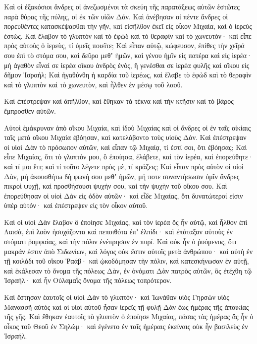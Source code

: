 {Καὶ οἱ ἑξακόσιοι ἄνδρες οἱ ἀνεζωσμένοι τὰ σκεύη τῆς παρατάξεως αὐτῶν ἑστῶτες παρὰ θύρας τῆς πύλης, οἱ ἐκ τῶν υἱῶν Δάν.
Καὶ ἀνέβησαν οἱ πέντε ἄνδρες οἱ πορευθέντες κατασκέψασθαι τὴν γῆν,
καὶ εἰσῆλθον ἐκεῖ εἰς οἶκον Μιχαία, καὶ ὁ ἱερεὺς ἑστώς. Καὶ ἔλαβον τὸ γλυπτὸν καὶ τὸ ἐφὼδ καὶ τὸ θεραφὶν καὶ τὸ χωνευτόν· καὶ εἶπε πρὸς αὐτοὺς ὁ ἱερεὺς, τί ὑμεῖς ποιεῖτε;
Καὶ εἶπαν αὐτῷ, κώφευσον, ἐπίθες τὴν χεῖρά σου ἐπὶ τὸ στόμα σου, καὶ δεῦρο μεθʼ ἡμῶν, καὶ γένου ἡμῖν εἰς πατέρα καὶ εἰς ἱερέα· μὴ ἀγαθὸν εἶναί σε ἱερέα οἴκου ἀνδρὸς ἑνὸς, ἢ γενέσθαι σε ἱερέα φυλῆς καὶ οἴκου εἰς δῆμον Ἰσραήλ;
Καὶ ἠγαθύνθη ἡ καρδία τοῦ ἱερέως, καὶ ἔλαβε τὸ ἐφὼδ καὶ τὸ θεραφὶν καὶ τὸ γλυπτὸν καὶ τὸ χωνευτὸν, καὶ ἦλθεν ἐν μέσῳ τοῦ λαοῦ.
\par }{\PP {}Καὶ ἐπέστρεψαν καὶ ἀπῆλθον, καὶ ἔθηκαν τὰ τέκνα καὶ τὴν κτῆσιν καὶ τὸ βάρος ἔμπροσθεν αὐτῶν.
\par }{\PP {}Αὐτοὶ ἐμάκρυναν ἀπὸ οἴκου Μιχαία, καὶ ἰδοὺ Μιχαίας καὶ οἱ ἄνδρες οἱ ἐν ταῖς οἰκίαις ταῖς μετὰ οἴκου Μιχαία ἐβόησαν, καὶ κατελάβοντο τοὺς υἱοὺς Δάν.
Καὶ ἐπέστρεψαν οἱ υἱοὶ Δὰν τὸ πρόσωπον αὐτῶν, καὶ εἶπαν τῷ Μιχαίᾳ, τί ἐστί σοι, ὅτι ἐβόησας;
Καὶ εἶπε Μιχαίας, ὅτι τὸ γλυπτόν μου, ὃ ἐποίησα, ἐλάβετε, καὶ τὸν ἱερέα, καὶ ἐπορεύθητε· καὶ τί μοι ἔτι; καὶ τί τοῦτο λέγετε πρὸς μὲ, τί κράζεις;
Καὶ εἶπαν πρὸς αὐτὸν οἱ υἱοὶ Δὰν, μὴ ἀκουσθήτω δὴ φωνή σου μεθʼ ἡμῶν, μή ποτε συναντήσωσιν ὑμῖν ἄνδρες πικροὶ ψυχῇ, καὶ προσθήσουσι ψυχήν σου, καὶ τὴν ψυχὴν τοῦ οἴκου σου.
Καὶ ἐπορεύθησαν οἱ υἱοὶ Δὰν εἰς ὁδὸν αὐτῶν· καὶ εἶδε Μιχαίας, ὅτι δυνατώτεροί εἰσιν ὑπὲρ αὐτόν· καὶ ἐπέστρεψεν εἰς τὸν οἶκον αὐτοῦ.
\par }{\PP {}Καὶ οἱ υἱοὶ Δὰν ἔλαβον ὃ ἐποίησε Μιχαίας, καὶ τὸν ἱερέα ὃς ἦν αὐτῷ, καὶ ἦλθον ἐπὶ Λαισὰ, ἐπὶ λαὸν ἡσυχάζοντα καὶ πεποιθότα ἐπʼ ἐλπίδι· καὶ ἐπάταξαν αὐτοὺς ἐν στόματι ῥομφαίας, καὶ τὴν πόλιν ἐνέπρησαν ἐν πυρί.
Καὶ οὐκ ἦν ὁ ῥυόμενος, ὅτι μακράν ἐστιν ἀπὸ Σιδωνίων, καὶ λόγος οὐκ ἔστιν αὐτοῖς μετὰ ἀνθρώπου· καὶ αὐτὴ ἐν τῇ κοιλάδι τοῦ οἴκου Ῥαάβ· καὶ ᾠκοδόμησαν τὴν πόλιν, καὶ κατεσκήνωσαν ἐν αὐτῇ,
καὶ ἐκάλεσαν τὸ ὄνομα τῆς πόλεως Δὰν, ἐν ὀνόματι Δὰν πατρὸς αὐτῶν, ὃς ἐτέχθη τῷ Ἰσραήλ· καὶ ἦν Οὐλαμαῒς ὄνομα τῆς πόλεως τοπρότερον.
\par }{\PP {}Καὶ ἔστησαν ἑαυτοῖς οἱ υἱοὶ Δὰν τὸ γλυπτόν· καὶ Ἰωνάθαν υἱὸς Γηρσὼν υἱὸς Μανασσῆ αὐτὸς καὶ οἱ υἱοὶ αὐτοῦ ἦσαν ἱερεῖς τῇ φυλῇ Δὰν ἕως ἡμέρας τῆς ἀποικίας τῆς γῆς.
Καὶ ἔθηκαν ἑαυτοῖς τὸ γλυπτὸν ὁ ἐποίησε Μιχαίας, πάσας τὰς ἡμέρας ἃς ἦν ὁ οἶκος τοῦ Θεοῦ ἐν Σηλώμ· καὶ ἐγένετο ἐν ταῖς ἡμέραις ἐκείναις οὐκ ἦν βασιλεὺς ἐν Ἰσραήλ.

}
